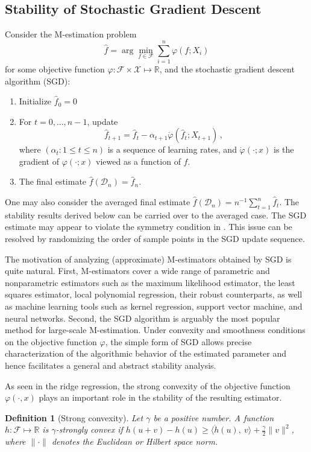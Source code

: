 \documentclass[11pt]{article}
\theoremstyle{plain}
\newtheorem{definition}[theorem]{Definition}
\newcommand{\D}{{\mathcal{D}}}
\newcommand{\X}{{\mathcal{X}}}
\begin{document}
\subsection{Stability of Stochastic Gradient Descent}\label{subsec:6.1-stab-sgd-1}
Consider the M-estimation problem
$$\hat f=\arg\min_{f\in\mathcal F}\sum_{i=1}^n \varphi(f;X_i)$$
for some objective function $\varphi:\mathcal F\times\X\mapsto \mathbb R$, and the stochastic gradient descent algorithm (SGD):
\begin{enumerate}
    \item Initialize $\hat f_0=0$
    \item For $t=0,...,n-1$, update $$\hat f_{t+1}=\hat f_t-\alpha_{t+1}\dot\varphi(\hat f_t;X_{t+1})\,,$$
  where $(\alpha_t:1\le t\le n)$ is a sequence of learning rates, and $\dot\varphi(\cdot;x)$ is the gradient of $\varphi(\cdot;x)$ viewed as a function of $ f$.
   \item The final estimate $\hat f(\D_n)=\hat f_n$.
\end{enumerate}
One may also consider the averaged final estimate $\hat f(\D_n)=n^{-1}\sum_{t=1}^n \hat f_t$. The stability results derived below can be carried over to the averaged case.  The SGD estimate may appear to violate the symmetry condition in . This issue can be resolved by randomizing the order of sample points in the SGD update sequence.

The motivation of analyzing (approximate) M-estimators obtained by SGD is quite natural. First, M-estimators cover a wide range of parametric and nonparametric estimators such as the maximum likelihood estimator, the least squares estimator, local polynomial regression, their robust counterparts, as well as machine learning tools such as kernel regression, support vector machine, and neural networks.  Second, the SGD algorithm is arguably the most popular method for large-scale M-estimation.  Under convexity and smoothness conditions on the objective function $\varphi$, the simple form of SGD allows precise characterization of the algorithmic behavior of the estimated parameter and hence facilitates a general and abstract stability analysis. 

As seen in the ridge regression, the strong convexity of the objective function $\varphi(\cdot,x)$ plays an important role in the stability of the resulting estimator. 
\begin{definition}
    [Strong convexity]\label{def:strong_convex} Let $\gamma$ be a positive number. A function $h:\mathcal F\mapsto \mathbb R$ is $\gamma$-strongly convex if
    $h(u+v)-h(u)\ge \langle\dot h(u),~v\rangle+\frac{\gamma}{2}\|v\|^2$, where $\|\cdot\|$ denotes the Euclidean or Hilbert space norm.
\end{definition}
\end{document}
